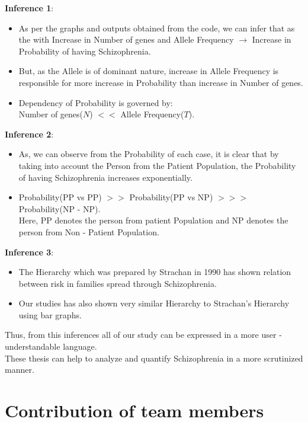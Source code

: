 \documentclass{article}
\begin{document}
\textbf{Inference 1}:
\begin{itemize}
    \item As per the graphs and outputs obtained from the code, we can infer that as the with Increase in Number of genes and Allele Frequency $\xrightarrow{}$ Increase in Probability of having Schizophrenia.
    \item But, as the Allele is of dominant nature, increase in Allele Frequency is responsible for more increase in Probability than increase in Number of genes.
    \item Dependency of Probability is governed by: \\
    Number of genes($N$) $ << $ Allele Frequency($T$).
\end{itemize}
\textbf{Inference 2}:
\begin{itemize}
    \item As, we can observe from the Probability of each case, it is clear that by taking into account the Person from the Patient Population, the Probability of having Schizophrenia increases exponentially.
    \item Probability(PP vs PP) $ >> $ Probability(PP vs NP) $ >>> $ Probability(NP - NP).\\
    Here, PP denotes the person from patient Population and NP denotes the person from Non - Patient Population. 
\end{itemize}
\textbf{Inference 3}:
\begin{itemize}
    \item The Hierarchy which was prepared by Strachan in 1990 has shown relation between risk in families spread through Schizophrenia.
    \item Our studies has also shown very similar Hierarchy to Strachan's Hierarchy using bar graphs. 
\end{itemize}
Thus, from this inferences all of our study can be expressed in a more user - understandable language.\\
These thesis can help to analyze and quantify Schizophrenia in a more scrutinized manner.

\newpage
\section{Contribution of team members}
\end{document}
